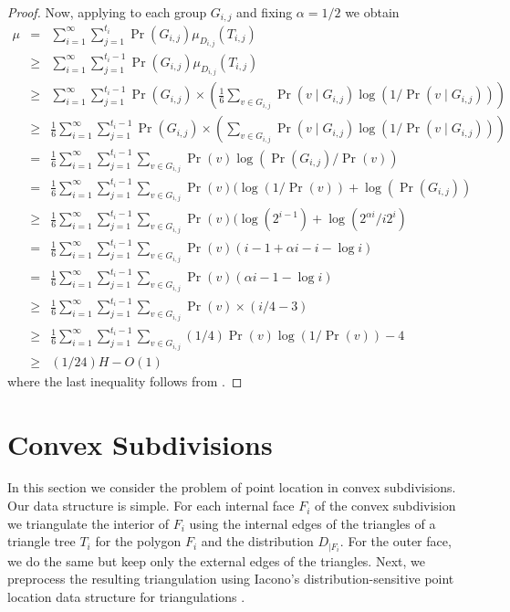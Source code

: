 \documentclass[charterfonts,lotsofwhite]{patmorin}
\begin{document}
\begin{proof}
Now, applying  to each group $G_{i,j}$ and fixing
$\alpha = 1/2$ we obtain
\begin{eqnarray*}
\mu & = & \sum_{i=1}^{\infty}\sum_{j=1}^{t_i}
	\Pr(G_{i,j})\mu_{D_{i,j}}(T_{i,j}) \\
& \ge & \sum_{i=1}^{\infty}\sum_{j=1}^{t_i-1}
	\Pr(G_{i,j})\mu_{D_{i,j}}(T_{i,j}) \\
& \ge & \sum_{i=1}^{\infty}\sum_{j=1}^{t_i-1}\Pr(G_{i,j})\times
	\left(\frac{1}{6}
	\sum_{v\in G_{i,j}}\Pr(v\mid G_{i,j})\log(1/\Pr(v\mid G_{i,j}))
	\right) \\
& \ge & \frac{1}{6}\sum_{i=1}^{\infty}\sum_{j=1}^{t_i-1}\Pr(G_{i,j})\times
	\left(
	\sum_{v\in G_{i,j}}\Pr(v\mid G_{i,j})\log(1/\Pr(v\mid G_{i,j}))
	\right) \\
& = & \frac{1}{6}\sum_{i=1}^{\infty}\sum_{j=1}^{t_i-1}
	\sum_{v\in G_{i,j}}\Pr(v)\log(\Pr(G_{i,j})/\Pr(v)) \\
& = & \frac{1}{6}\sum_{i=1}^{\infty}\sum_{j=1}^{t_i-1}
	\sum_{v\in G_{i,j}}\Pr(v)(\log(1/\Pr(v))+ \log(\Pr(G_{i,j})) \\
& \ge & \frac{1}{6}\sum_{i=1}^{\infty}\sum_{j=1}^{t_i-1}
	\sum_{v\in G_{i,j}}\Pr(v)(\log(2^{i-1}) + \log(2^{\alpha i}/i2^{i}) \\
& = & \frac{1}{6}\sum_{i=1}^{\infty}\sum_{j=1}^{t_i-1}
	\sum_{v\in G_{i,j}}\Pr(v)(i-1 + \alpha i -i -\log i) \\
& = & \frac{1}{6}\sum_{i=1}^{\infty}\sum_{j=1}^{t_i-1}
	\sum_{v\in G_{i,j}}\Pr(v)(\alpha i  -1 -\log i) \\
& \ge & \frac{1}{6}\sum_{i=1}^{\infty}\sum_{j=1}^{t_i-1}
	\sum_{v\in G_{i,j}}\Pr(v)\times (i/4 - 3) \\
& \ge & \frac{1}{6}\sum_{i=1}^{\infty}\sum_{j=1}^{t_i-1}
	\sum_{v\in G_{i,j}}(1/4)\Pr(v)\log (1/\Pr(v))-4 \\
& \ge & (1/24)H - O(1) 
\end{eqnarray*}
where the last inequality follows from .
\end{proof}

\section{Convex Subdivisions}

In this section we consider the problem of point location in convex
subdivisions. Our data structure is simple.  For each internal face
$F_i$ of the convex subdivision we triangulate the interior of $F_i$
using the internal edges of the triangles of a triangle tree $T_i$ for
the polygon $F_i$ and the distribution $D_{|F_i}$. For the outer face,
we do the same but keep only the external edges of the triangles.
Next, we preprocess the resulting triangulation using Iacono's
distribution-sensitive point location data structure for
triangulations \cite{i01}.
\end{document}
